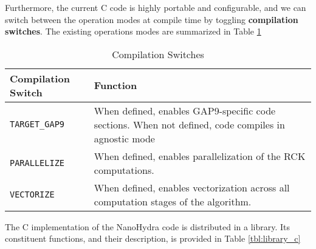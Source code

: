     Furthermore, the current C code is highly portable and configurable, and we can switch between the operation modes at compile time by toggling \textbf{compilation switches}.
    The existing operations modes are summarized in Table \ref{tbl:compile_switches}

    \begin{table}[h!]
    \begin{tabular}{||p{1.5in}|p{4in}||}
        \hline
        Compilation Switch & Function  \\

        \hline\hline
        \verb|TARGET_GAP9| & When defined, enables GAP9-specific code sections. When not defined, code compiles in agnostic mode \\
        \hline
        \verb|PARALLELIZE| & When defined, enables parallelization of the RCK computations. \\
        \hline
        \verb|VECTORIZE|   & When defined, enables vectorization across all computation stages of the algorithm. \\
        \hline
    \end{tabular}
    \caption{Compilation Switches}
    \label{tbl:compile_switches}
    \end{table}

    The C implementation of the NanoHydra code is distributed in a library. Its constituent functions, and their description, is
    provided in Table \ref{tbl:library_c}

